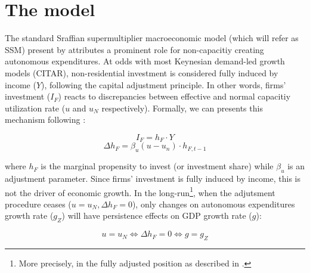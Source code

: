 \documentclass{SelfArx}
\begin{document}
\section{The model}
\label{sec:model:ch_super}
The standard Sraffian supermultiplier macroeconomic model (which will refer as SSM) present by \textcite{serrano_1995_Long,bortis_1996_Structural} attributes a prominent role for non-capacitiy creating autonomous expenditures.
At odds with most Keynesian demand-led growth models (CITAR), non-residential investment is considered fully induced by income (\(Y\)), following the capital adjustment principle.
In other words, firms' investment (\(I_{F}\)) reacts to discrepancies between effective and normal capacitiy utilization rate (\(u\) and \(u_{N}\) respectively).
Formally, we can presents this mechanism following \textcite{serrano_2017_Sraffian}:
\begin{latex}
\begin{equation}
\label{Ch_super_EQ_inv_super_macro}
I_{F} = h_{F}\cdot Y
\end{equation}
\begin{equation}
\Delta h_{F} = \beta_{u}(u - u_{n})\cdot h_{F,t-1}
\end{equation}
\end{latex}
where \(h_{F}\) is the marginal propensity to invest (or investment share) while \(\beta_{u}\) is an adjustment parameter.
Since firms' investment is fully induced by income, this is not the driver of economic growth.
In the long-run\footnote{More precisely, in the fully adjusted position as described in \cite{freitas_2015_Growth}.}, when the adjutsment procedure ceases (\(u = u_{N}, \Delta h_{F} = 0\)), only changes on autonomous expenditures growth rate (\(g_{Z}\)) will have persistence effects on GDP growth rate (\(g\)):
\begin{latex}
\begin{equation}
u = u_{N} \Leftrightarrow \Delta h_{F} = 0 \Leftrightarrow g = g_{Z}
\end{equation}
\end{latex}
\end{document}
